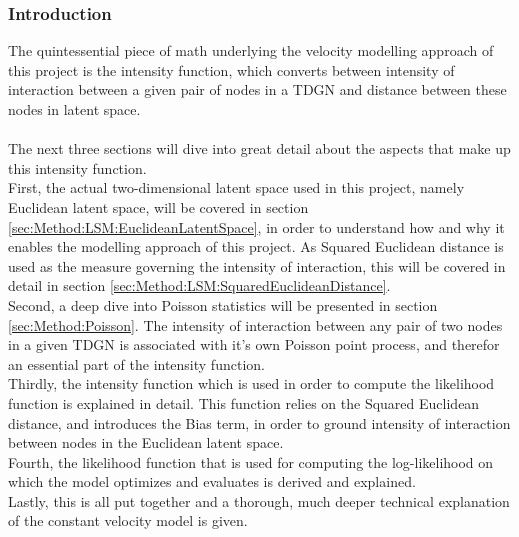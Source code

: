

\subsubsection{Introduction}
\label{sec:Method:VModel:IntensityFuncIntro}

The quintessential piece of math underlying the velocity modelling approach of this project is the intensity function, which converts between intensity of interaction between a given pair of nodes in a TDGN and distance between these nodes in latent space.
\\\\
The next three sections will dive into great detail about the aspects that make up this intensity function.
\\
First, the actual two-dimensional latent space used in this project, namely Euclidean latent space, will be covered in section \ref{sec:Method:LSM:EuclideanLatentSpace}, in order to understand how and why it enables the modelling approach of this project. 
As Squared Euclidean distance is used as the measure governing the intensity of interaction, this will be covered in detail in section \ref{sec:Method:LSM:SquaredEuclideanDistance}.
\\
Second, a deep dive into Poisson statistics will be presented in section \ref{sec:Method:Poisson}.
The intensity of interaction between any pair of two nodes in a given TDGN is associated with it's own Poisson point process, and therefor an essential part of the intensity function.
\\
Thirdly, the intensity function which is used in order to compute the likelihood function is explained in detail.
This function relies on the Squared Euclidean distance, and introduces the Bias term, in order to ground intensity of interaction between nodes in the Euclidean latent space.
\\
Fourth, the likelihood function that is used for computing the log-likelihood on which the model optimizes and evaluates is derived and explained.
\\
Lastly, this is all put together and a thorough, much deeper technical explanation of the constant velocity model is given.